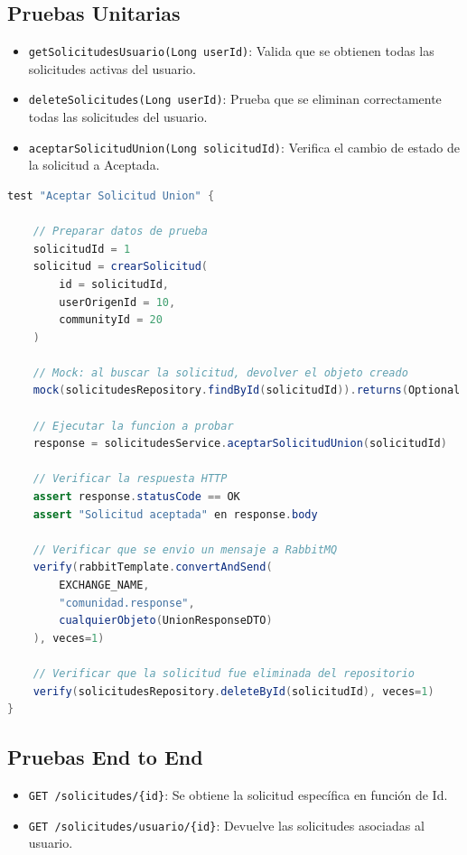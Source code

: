 \subsection{Pruebas Unitarias}
\begin{itemize}
    \item \texttt{getSolicitudesUsuario(Long userId)}: Valida que se obtienen todas las solicitudes activas del usuario.
    \item \texttt{deleteSolicitudes(Long userId)}: Prueba que se eliminan correctamente todas las solicitudes del usuario.
    \item \texttt{aceptarSolicitudUnion(Long solicitudId)}: Verifica el cambio de estado de la solicitud a Aceptada.
\end{itemize}
\begin{lstlisting}[language=Java, caption={Pseudocódigo del test aceptarSolicitudUnion}]
test "Aceptar Solicitud Union" {
    
    // Preparar datos de prueba
    solicitudId = 1
    solicitud = crearSolicitud(
        id = solicitudId,
        userOrigenId = 10,
        communityId = 20
    )

    // Mock: al buscar la solicitud, devolver el objeto creado
    mock(solicitudesRepository.findById(solicitudId)).returns(Optional.of(solicitud))

    // Ejecutar la funcion a probar
    response = solicitudesService.aceptarSolicitudUnion(solicitudId)

    // Verificar la respuesta HTTP
    assert response.statusCode == OK
    assert "Solicitud aceptada" en response.body

    // Verificar que se envio un mensaje a RabbitMQ
    verify(rabbitTemplate.convertAndSend(
        EXCHANGE_NAME,
        "comunidad.response",
        cualquierObjeto(UnionResponseDTO)
    ), veces=1)

    // Verificar que la solicitud fue eliminada del repositorio
    verify(solicitudesRepository.deleteById(solicitudId), veces=1)
}
\end{lstlisting}
\subsection{Pruebas End to End}
\begin{itemize}
    \item \texttt{GET /solicitudes/\{id\}}: Se obtiene la solicitud específica en función de Id.
    \item \texttt{GET /solicitudes/usuario/\{id\}}: Devuelve las solicitudes asociadas al usuario.
\end{itemize}


